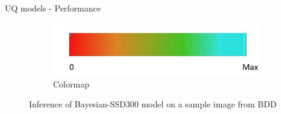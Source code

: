 \documentclass[10pt, aspectratio=169]{beamer}
\begin{document}
\begin{frame}[allowframebreaks]{UQ models - Performance}
\begin{figure}[H]
           \begin{center}
               \begin{subfigure}[t]{0.275\textwidth}
               \includegraphics[width=\textwidth]{images/Slide4.jpg}
               \caption{Colormap}
           \end{subfigure}
           \end{center}
           \caption{Inference of Bayesian-SSD300 model on a sample image from BDD}
       \end{figure}
    

\end{frame}
\end{document}
